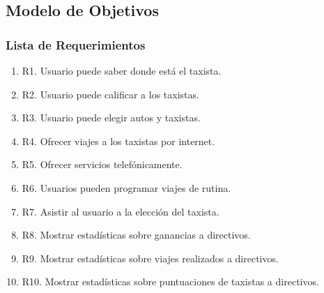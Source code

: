 \subsection{Modelo de Objetivos}
\subsubsection{Lista de Requerimientos}
	\begin{enumerate}
		\item \label{req:R1}R1. Usuario puede saber donde está el taxista.		
		
		\item \label{req:R2}R2. Usuario puede calificar a los taxistas.		
		
		\item \label{req:R3}R3. Usuario puede elegir autos y taxistas.		
		
		\item \label{req:R4}R4. Ofrecer viajes a los taxistas por internet.		
		
		\item \label{req:R5}R5. Ofrecer servicios telefónicamente.		

		\item \label{req:R6}R6. Usuarios pueden programar viajes de 
		rutina.		
		
		\item \label{req:R7}R7. Asistir al usuario a la elección del taxista.		
		
		\item \label{req:R8}R8. Mostrar estadísticas sobre ganancias a directivos.		
		
		\item \label{req:R9}R9. Mostrar estadísticas sobre viajes realizados a directivos.		
		
		\item \label{req:R10}R10. Mostrar estadísticas sobre puntuaciones de taxistas a directivos.
	\end{enumerate}
